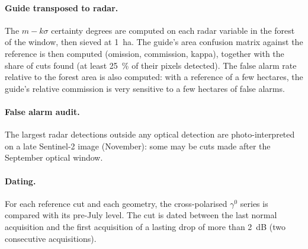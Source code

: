 \paragraph{Guide transposed to radar.} The $m-k\sigma$ certainty degrees are computed on each radar variable in the
forest of the window, then sieved at 1~ha. The guide's area confusion matrix against the reference is then
computed (omission, commission, kappa), together with the share of cuts found (at least 25~\% of their pixels
detected). The false alarm rate relative to the forest area is also computed: with a reference of a few hectares,
the guide's relative commission is very sensitive to a few hectares of false alarms.

\paragraph{False alarm audit.} The largest radar detections outside any optical detection are photo-interpreted
on a late Sentinel-2 image (November): some may be cuts made after the September optical window.

\paragraph{Dating.} For each reference cut and each geometry, the cross-polarised $\gamma^0$ series is compared
with its pre-July level. The cut is dated between the last normal acquisition and the first acquisition of a
lasting drop of more than 2~dB (two consecutive acquisitions).
